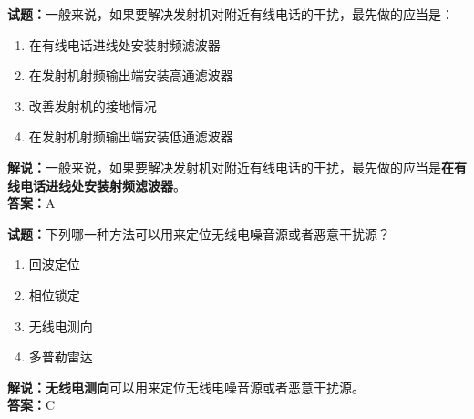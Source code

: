 \documentclass{ctexbook}
\begin{document}
\bigskip


\noindent\textbf{试题：}一般来说，如果要解决发射机对附近有线电话的干扰，最先做的应当是：
\begin{enumerate}[leftmargin=3em]
\item 在有线电话进线处安装射频滤波器
\item 在发射机射频输出端安装高通滤波器
\item 改善发射机的接地情况
\item 在发射机射频输出端安装低通滤波器
\end{enumerate}
\noindent\textbf{解说：}一般来说，如果要解决发射机对附近有线电话的干扰，最先做的应当是\textbf{在有线电话进线处安装射频滤波器}。\\\noindent\textbf{答案：}A



\bigskip


\noindent\textbf{试题：}下列哪一种方法可以用来定位无线电噪音源或者恶意干扰源？
\begin{enumerate}[leftmargin=3em]
\item 回波定位
\item 相位锁定
\item 无线电测向
\item 多普勒雷达
\end{enumerate}
\noindent\textbf{解说：}\textbf{无线电测向}可以用来定位无线电噪音源或者恶意干扰源。\\\noindent\textbf{答案：}C









%
\end{document}
